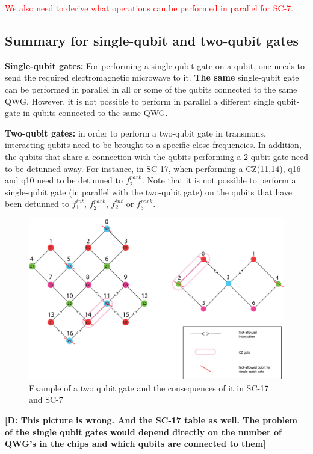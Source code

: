 \documentclass[11pt]{article}
\def\noteD#1{\textbf{\color{magenta}[D: #1]}}
\begin{document}
\textcolor{red}{We also need to derive what operations can be performed in parallel for SC-7.}

\subsection{Summary for single-qubit and two-qubit gates}

\textbf{Single-qubit gates:} For performing a single-qubit gate on a qubit, one needs to send the required electromagnetic microwave to it.  \textbf{The same} single-qubit gate can be performed in parallel in all or some of the qubits connected to the same QWG. However, it is not possible to perform in parallel a different single qubit-gate in qubits connected to the same QWG.

\textbf{Two-qubit gates:} in order to perform a two-qubit gate in transmons, interacting qubits need to be brought to a specific close frequencies. In addition, the qubits that share a connection with the qubits performing a 2-qubit gate need to be detunned away. For instance, in SC-17, when performing a CZ(11,14), q16 and q10 need to be detunned to $f_{2}^{park}$. Note that it is not possible to perform a single-qubit gate (in parallel with the two-qubit gate) on the qubits that have been detunned to  $f_{1}^{int}$,  $f_{2}^{park}$, $f_{2}^{int}$ or $f_{3}^{park}$. 

\begin{figure}[h!]
\centering
\includegraphics[width=\textwidth]{two_qubit_constraint_sc17.png}
\caption{\label{two_qubit_gate_ex}
Example of a two qubit gate and the consequences of it in SC-17 and SC-7}
\end{figure}

\noteD{This picture is wrong. And the SC-17 table as well. The problem of the single qubit gates would depend directly on the number of QWG's in the chips and which qubits are connected to them}
\end{document}
